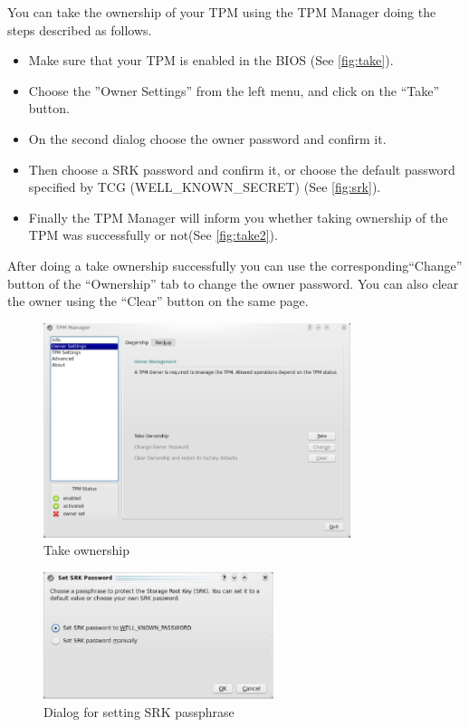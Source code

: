 \documentclass[
  american        %
]{sirrixreport}
\begin{document}
You can take the ownership of your TPM using the TPM Manager doing the steps described as follows.
\begin{itemize}
   \item Make sure that your TPM is enabled in the BIOS (See \autoref{fig:take}).
   \item Choose the ''Owner Settings'' from the left menu, and click on the ``Take'' button.
   \item On the second dialog choose the owner password and confirm it.
   \item Then choose a SRK password and confirm it, or choose the default password specified by TCG (WELL\_KNOWN\_SECRET) (See \autoref{fig:srk}).
   \item Finally the TPM Manager will inform you whether taking ownership of the TPM was successfully or not(See \autoref{fig:take2}).
\end{itemize}
After doing a take ownership successfully you can use the corresponding``Change'' button of the ``Ownership'' tab to change the owner password. You can also clear the owner using the ``Clear'' button on the same page.
\begin{figure}[h]
 \centering
   \includegraphics[width=0.8\textwidth]{images/man_takeowner}
   \caption{Take ownership}
\label{fig:take}
\end{figure}
\begin{figure}[h]
 \centering
   \includegraphics[width=0.6\textwidth]{images/man_setsrkpass}
   \caption{Dialog for setting SRK passphrase}
\label{fig:srk}
\end{figure}
\end{document}
